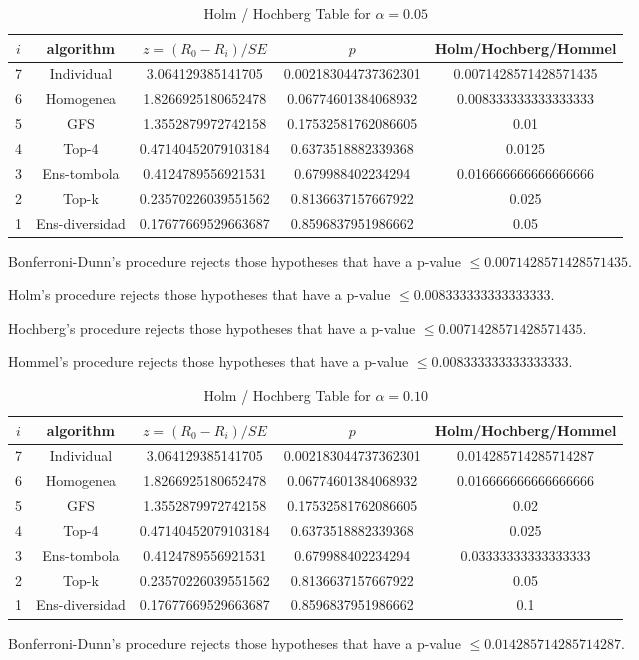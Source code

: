 \documentclass[a4paper,10pt]{article}
\begin{document}
\begin{landscape}
\begin{table}[!htp]
\centering\tiny
\caption{Holm / Hochberg Table for $\alpha=0.05$}
\begin{tabular}{ccccc}
$i$&algorithm&$z=(R_0 - R_i)/SE$&$p$&Holm/Hochberg/Hommel\\
\hline
7&Individual&3.064129385141705&0.002183044737362301&0.0071428571428571435\\
6&Homogenea&1.8266925180652478&0.06774601384068932&0.008333333333333333\\
5&GFS&1.3552879972742158&0.17532581762086605&0.01\\
4&Top-4&0.47140452079103184&0.6373518882339368&0.0125\\
3&Ens-tombola&0.4124789556921531&0.679988402234294&0.016666666666666666\\
2&Top-k&0.23570226039551562&0.8136637157667922&0.025\\
1&Ens-diversidad&0.17677669529663687&0.8596837951986662&0.05\\
\hline
\end{tabular}
\end{table}
Bonferroni-Dunn's procedure rejects those hypotheses that have a p-value $\le0.0071428571428571435$.


Holm's procedure rejects those hypotheses that have a p-value $\le0.008333333333333333$.


Hochberg's procedure rejects those hypotheses that have a p-value $\le0.0071428571428571435$.


Hommel's procedure rejects those hypotheses that have a p-value $\le0.008333333333333333$.


\begin{table}[!htp]
\centering\tiny
\caption{Holm / Hochberg Table for $\alpha=0.10$}
\begin{tabular}{ccccc}
$i$&algorithm&$z=(R_0 - R_i)/SE$&$p$&Holm/Hochberg/Hommel\\
\hline
7&Individual&3.064129385141705&0.002183044737362301&0.014285714285714287\\
6&Homogenea&1.8266925180652478&0.06774601384068932&0.016666666666666666\\
5&GFS&1.3552879972742158&0.17532581762086605&0.02\\
4&Top-4&0.47140452079103184&0.6373518882339368&0.025\\
3&Ens-tombola&0.4124789556921531&0.679988402234294&0.03333333333333333\\
2&Top-k&0.23570226039551562&0.8136637157667922&0.05\\
1&Ens-diversidad&0.17677669529663687&0.8596837951986662&0.1\\
\hline
\end{tabular}
\end{table}
Bonferroni-Dunn's procedure rejects those hypotheses that have a p-value $\le0.014285714285714287$.



\end{landscape}
\end{document}
